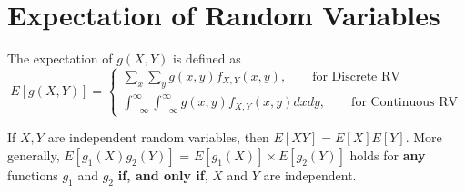 \section{Expectation of Random Variables}
\begin{definition}[Expectation]
The expectation of $g(X,Y)$ is defined as 
\begin{equation*}
E[g(X,Y)] = 
\begin{cases}
\sum_x \sum_y g(x,y) f_{X,Y}(x,y), \qquad \text{for Discrete RV} \\
\int_{-\infty}^{\infty} \int_{-\infty}^{\infty} g(x,y) f_{X,Y}(x,y) dx dy, \qquad \text{for Continuous RV}
\end{cases}
\end{equation*}
\end{definition}

\begin{note}
\end{note}
If $X,Y$ are independent random variables, then $E[XY] = E[X]E[Y]$. More generally, $E[g_1(X)g_2(Y)]$ = $E[g_1(X)] \times E[g_2(Y)]$ holds for \textbf{any} functions $g_1$ and $g_2$ \textbf{if, and only if}, $X$ and $Y$ are independent. 
\begin{note}
\end{note}
